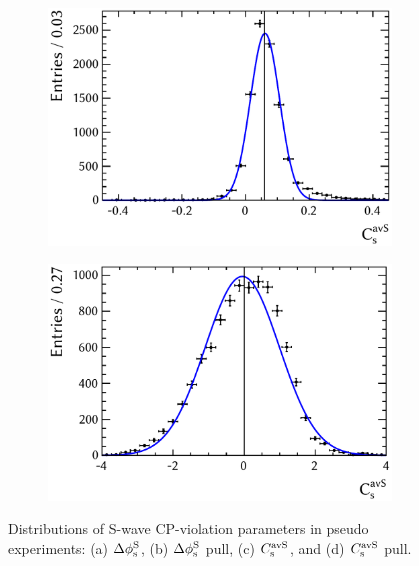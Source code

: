 \begin{figure}[tbp]
  \vspace*{0.02\textwidth}
  \begin{subfigure}{0.49\textwidth}
    \includegraphics[width=\textwidth]{graphics/results/parDist_polarDep_CCPAv_AS}
    \caption{}
  \end{subfigure}
  \hfill%
  \begin{subfigure}{0.49\textwidth}
    \includegraphics[width=\textwidth]{graphics/results/pullDist_polarDep_CCPAv_AS}
    \caption{}
  \end{subfigure}

  \caption{Distributions of S-wave CP-violation parameters in pseudo experiments:
           (a) $\Delta\phi_\text{s}^\text{S}$, (b) $\Delta\phi_\text{s}^\text{S}$ pull, (c) $C_\text{s}^\text{avS}$, and (d) $C_\text{s}^\text{avS}$ pull.}
  \label{fig:parDists_SWave_CPV}
\end{figure}

